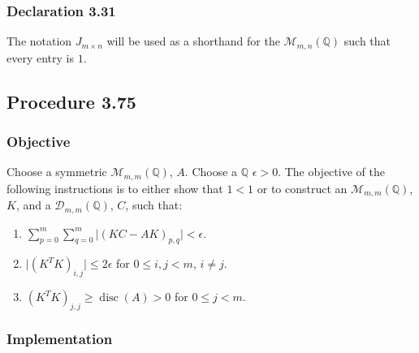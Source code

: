 \documentclass[twocolumn]{article}
\DeclareMathOperator{\disc}{disc}
\newcommand{\declaration}[1]{\subsubsection*{Declaration #1}\label{sec:declaration #1}}
\newcommand{\procedure}[2][]{\subsection*{Procedure #2 \ifthenelse{\equal{#1}{}}{}{(#1)}}\label{sec:procedure #2}}
\newcommand{\objective}{\subsubsection*{Objective}}
\newcommand{\implementation}{\subsubsection*{Implementation}}
\begin{document}
		\declaration{3.31}
			The notation $J_{m\times n}$ will be used as a shorthand for the $\mathcal{M}_{m,n}(\mathbb{Q})$ such that every entry is $1$.
		\procedure{3.75}
			\objective
				Choose a symmetric $\mathcal{M}_{m,m}(\mathbb{Q})$, $A$. Choose a $\mathbb{Q}$ $\epsilon>0$. The objective of the following instructions is to either show that $1<1$ or to construct an $\mathcal{M}_{m,m}(\mathbb{Q})$, $K$, and a $\mathcal{D}_{m,m}(\mathbb{Q})$, $C$, such that:
				\begin{enumerate}
					\item $\sum_{p=0}^m\sum_{q=0}^m\lvert(KC-AK)_{p,q}\rvert<\epsilon$.
					\item $\lvert(K^TK)_{i,j}\rvert\le 2\epsilon$ for $0\le i,j<m$, $i\ne j$.
					\item $(K^TK)_{j,j}\ge\disc(A)>0$ for $0\le j<m$.
				\end{enumerate}
			\implementation
\end{document}
